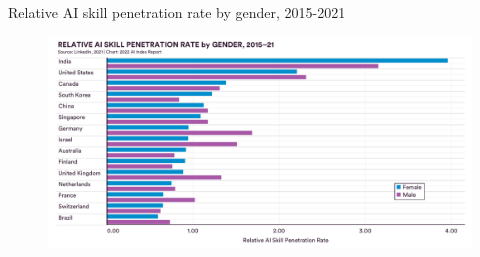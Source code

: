 {

\begin{frame}{
Relative AI skill penetration rate by gender, 2015-2021
}

\begin{figure}
 \centering
 \includegraphics[width=1.0\textwidth]{./figures/progress-of-air-f/outputs/drawing-v00.png}
\end{figure}

\end{frame}
}





